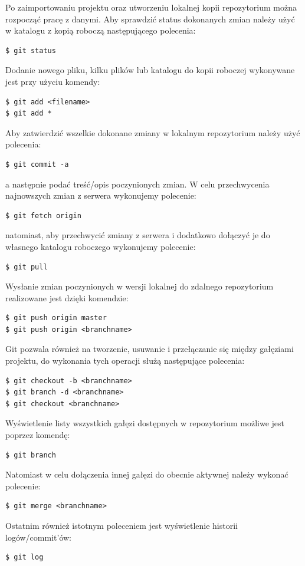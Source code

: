Po zaimportowaniu projektu oraz utworzeniu lokalnej kopii repozytorium można rozpocząć pracę z danymi. Aby sprawdzić status dokonanych zmian należy użyć w katalogu z kopią roboczą następującego polecenia:
\begin{lstlisting}[style=incode]
$ git status
\end{lstlisting}
Dodanie nowego pliku, kilku plików lub katalogu do kopii roboczej wykonywane jest przy użyciu komendy:
\begin{lstlisting}[style=incode]
$ git add <filename>
$ git add *
\end{lstlisting}
Aby zatwierdzić wszelkie dokonane zmiany w lokalnym repozytorium należy użyć polecenia:
\begin{lstlisting}[style=incode]
$ git commit -a
\end{lstlisting}
a następnie podać treść/opis poczynionych zmian.
W celu przechwycenia najnowszych zmian z serwera wykonujemy polecenie:
\begin{lstlisting}[style=incode]
$ git fetch origin
\end{lstlisting}
natomiast, aby przechwycić zmiany z serwera i dodatkowo dołączyć je do własnego katalogu roboczego wykonujemy polecenie:
\begin{lstlisting}[style=incode]
$ git pull
\end{lstlisting}

Wysłanie zmian poczynionych w wersji lokalnej do zdalnego repozytorium realizowane jest dzięki komendzie:
\begin{lstlisting}[style=incode]
$ git push origin master
$ git push origin <branchname>
\end{lstlisting}
Git pozwala również na tworzenie, usuwanie i przełączanie się między gałęziami projektu, do wykonania tych operacji służą następujące polecenia:
\begin{lstlisting}[style=incode]
$ git checkout -b <branchname>
$ git branch -d <branchname>
$ git checkout <branchname>
\end{lstlisting}
Wyświetlenie listy wszystkich gałęzi dostępnych w repozytorium możliwe jest poprzez komendę:
\begin{lstlisting}[style=incode]
$ git branch
\end{lstlisting}
Natomiast w celu dołączenia innej gałęzi do obecnie aktywnej należy wykonać polecenie:
\begin{lstlisting}[style=incode]
$ git merge <branchname>
\end{lstlisting}

Ostatnim również istotnym poleceniem jest wyświetlenie historii logów/commit'ów:
\begin{lstlisting}[style=incode]
$ git log
\end{lstlisting}

